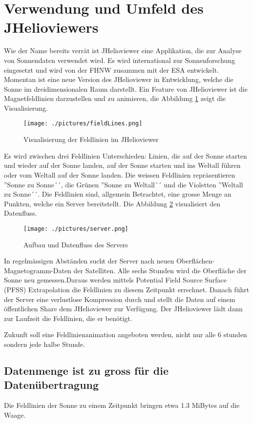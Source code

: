 \section{Verwendung und Umfeld des JHelioviewers}
Wie der Name bereits verrät ist JHelioviewer eine Applikation,  die zur Analyse von Sonnendaten verwendet wird. Es wird international zur Sonnenforschung eingesetzt und wird von der FHNW zusammen mit der ESA entwickelt. Momentan ist eine neue Version des JHelioviewer in Entwicklung, welche die Sonne im dreidimensionalen Raum darstellt. Ein Feature von JHelioviewer ist die Magnetfeldlinien darzustellen und zu animieren, die Abbildung \ref{einleitung::feldlinien} zeigt die Visualisierung.
\begin{figure}[!htbp]
\center
	\texttt{[image: ./pictures/fieldLines.png]}
	\caption{Visualisierung der Feldlinien im JHelioviewer}
	\label{einleitung::feldlinien}
\end{figure}
Es wird zwischen drei Feldlinien Unterschieden: Linien, die auf der Sonne starten und wieder auf der Sonne landen, auf der Sonne starten und ins Weltall führen oder vom Weltall auf der Sonne landen. Die weissen Feldlinien repräsentieren ''Sonne zu Sonne´´, die Grünen ''Sonne zu Weltall´´ und die Violetten ''Weltall zu Sonne´´. Die Feldlinien sind, allgemein Betrachtet, eine grosse Menge an Punkten, welche ein Server bereitstellt. Die Abbildung \ref{einleitung::aufbau} visualisiert den Datenfluss.
\begin{figure}[!htbp]
\center
	\texttt{[image: ./pictures/server.png]}
	\caption{Aufbau und Datenfluss des Servers}
	\label{einleitung::aufbau}
\end{figure}
In regelmässigen Abständen sucht der Server nach neuen Oberflächen-Magnetogramm-Daten der Satelliten. Alle sechs Stunden wird die Oberfläche der Sonne neu gemessen.Daraus werden mittels Potential Field Source Surface (PFSS) Extrapolation die Feldlinien zu diesem Zeitpunkt errechnet. Danach führt der Server eine verlustlose Kompression durch und stellt die Daten auf einem öffentlichen Share dem JHelioviewer zur Verfügung. Der JHelioviewer lädt dann zur Laufzeit die Feldlinien, die er benötigt. 

Zukunft soll eine Feldlinienanimation angeboten werden, nicht nur alle 6 stunden sondern jede halbe Stunde.

\subsection{Datenmenge ist zu gross für die Datenübertragung}
Die Feldlinien der Sonne zu einem Zeitpunkt bringen etwa 1.3 MiBytes auf die Waage. 

